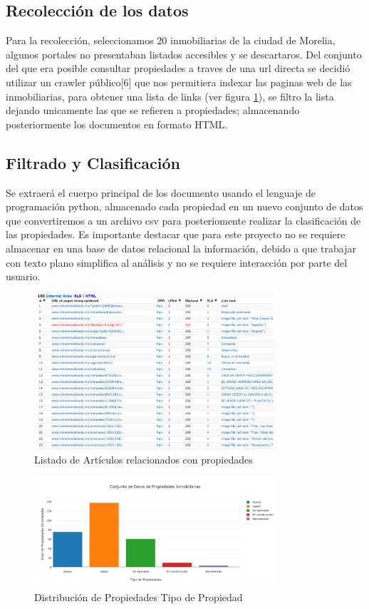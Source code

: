 \subsection{Recolección de los datos}

Para la recolección, seleccionamos 20 inmobiliarias de la ciudad de Morelia, algunos portales no presentaban listados accesibles y se descartaros.
Del conjunto del que era posible consultar propiedades a traves de una url directa se decidió  utilizar un crawler público{[}6{]} que nos permitiera indexar las paginas web de las inmobiliarias, para obtener una lista de links (ver figura \ref{fig:CrawlerList}), se filtro la lista dejando unicamente las que se refieren a propiedades; almacenando posteriormente los documentos en formato HTML. 
\subsection{Filtrado y Clasificación}

Se extraerá el cuerpo principal de los documento usando el lenguaje de programación python, almacenado cada propiedad en un nuevo conjunto de datos  que convertiremos a un archivo csv para posteriomente  realizar la clasificación de las propiedades. Es importante destacar que para este proyecto no se requiere almacenar en una base de datos relacional la información, debido a que trabajar con texto plano simplifica al análisis y no se requiere interacción por parte del usuario.


\begin{figure}[ht]
\centering
\includegraphics[width=0.8\textwidth]{CrawlerSite.png}
\caption{Listado de Artículos relacionados con propiedades}
\label{fig:CrawlerList}
\end{figure}


\begin{figure}[ht]
\centering
\includegraphics[width=0.8\textwidth]{PropiedadesInmobiliariasEstadoVivienda.png}
\caption{Distribución de Propiedades Tipo de Propiedad}
\label{fig:PropiedadesType}
\end{figure}

